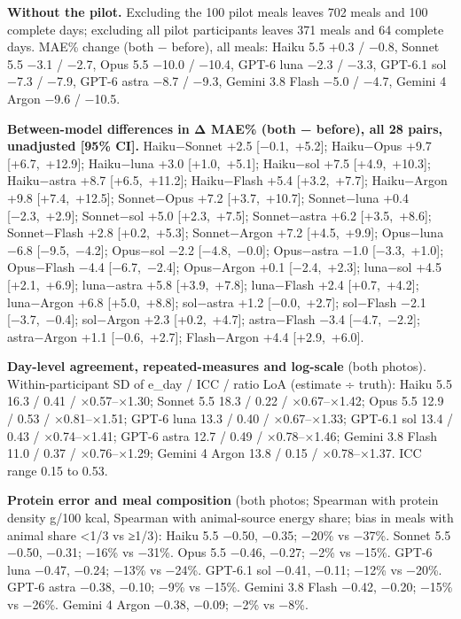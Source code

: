 \documentclass[
  11pt,
  letterpaper]{article}
\begin{document}
\textbf{Without the pilot.} Excluding the 100 pilot meals leaves 702 meals and 100 complete days; excluding
all pilot participants leaves 371 meals and 64 complete days. MAE\% change (both − before), all meals: Haiku
5.5 +0.3 / −0.8, Sonnet 5.5 −3.1 / −2.7, Opus 5.5 −10.0 / −10.4, GPT-6 luna −2.3 / −3.3, GPT-6.1 sol −7.3 /
−7.9, GPT-6 astra −8.7 / −9.3, Gemini 3.8 Flash −5.0 / −4.7, Gemini 4 Argon −9.6 / −10.5.

\textbf{Between-model differences in Δ MAE\% (both − before), all 28 pairs, unadjusted {[}95\% CI{]}.}
Haiku−Sonnet +2.5 {[}−0.1,~+5.2{]}; Haiku−Opus +9.7 {[}+6.7,~+12.9{]}; Haiku−luna +3.0 {[}+1.0,~+5.1{]};
Haiku−sol +7.5 {[}+4.9,~+10.3{]}; Haiku−astra +8.7 {[}+6.5,~+11.2{]}; Haiku−Flash +5.4 {[}+3.2,~+7.7{]};
Haiku−Argon +9.8 {[}+7.4,~+12.5{]}; Sonnet−Opus +7.2 {[}+3.7,~+10.7{]}; Sonnet−luna +0.4 {[}−2.3,~+2.9{]};
Sonnet−sol +5.0 {[}+2.3,~+7.5{]}; Sonnet−astra +6.2 {[}+3.5,~+8.6{]}; Sonnet−Flash +2.8 {[}+0.2,~+5.3{]};
Sonnet−Argon +7.2 {[}+4.5,~+9.9{]}; Opus−luna −6.8 {[}−9.5,~−4.2{]}; Opus−sol −2.2 {[}−4.8,~−0.0{]};
Opus−astra −1.0 {[}−3.3,~+1.0{]}; Opus−Flash −4.4 {[}−6.7,~−2.4{]}; Opus−Argon +0.1 {[}−2.4,~+2.3{]}; luna−sol
+4.5 {[}+2.1,~+6.9{]}; luna−astra +5.8 {[}+3.9,~+7.8{]}; luna−Flash +2.4 {[}+0.7,~+4.2{]}; luna−Argon +6.8
{[}+5.0,~+8.8{]}; sol−astra +1.2 {[}−0.0,~+2.7{]}; sol−Flash −2.1 {[}−3.7,~−0.4{]}; sol−Argon +2.3
{[}+0.2,~+4.7{]}; astra−Flash −3.4 {[}−4.7,~−2.2{]}; astra−Argon +1.1 {[}−0.6,~+2.7{]}; Flash−Argon +4.4
{[}+2.9,~+6.0{]}.

\textbf{Day-level agreement, repeated-measures and log-scale} (both photos). Within-participant SD of e\_day /
ICC / ratio LoA (estimate ÷ truth): Haiku 5.5 16.3 / 0.41 / ×0.57--×1.30; Sonnet 5.5 18.3 / 0.22 /
×0.67--×1.42; Opus 5.5 12.9 / 0.53 / ×0.81--×1.51; GPT-6 luna 13.3 / 0.40 / ×0.67--×1.33; GPT-6.1 sol 13.4 /
0.43 / ×0.74--×1.41; GPT-6 astra 12.7 / 0.49 / ×0.78--×1.46; Gemini 3.8 Flash 11.0 / 0.37 / ×0.76--×1.29;
Gemini 4 Argon 13.8 / 0.15 / ×0.78--×1.37. ICC range 0.15 to 0.53.

\textbf{Protein error and meal composition} (both photos; Spearman with protein density g/100 kcal, Spearman
with animal-source energy share; bias in meals with animal share \textless1/3 vs ≥1/3): Haiku 5.5 −0.50,
−0.35; −20\% vs −37\%. Sonnet 5.5 −0.50, −0.31; −16\% vs −31\%. Opus 5.5 −0.46, −0.27; −2\% vs −15\%. GPT-6
luna −0.47, −0.24; −13\% vs −24\%. GPT-6.1 sol −0.41, −0.11; −12\% vs −20\%. GPT-6 astra −0.38, −0.10; −9\% vs
−15\%. Gemini 3.8 Flash −0.42, −0.20; −15\% vs −26\%. Gemini 4 Argon −0.38, −0.09; −2\% vs −8\%.
\end{document}
